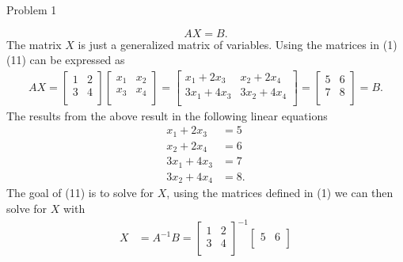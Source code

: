 \begin{problem}{Problem 1}
\begin{highlight}[Solution]
        \begin{equation}
            AX = B.
        \end{equation}
        The matrix $X$ is just a generalized matrix of variables. Using the matrices in (1) (11) can be expressed as 
        \begin{align*}
            AX = 
            \begin{bmatrix}
                1 & 2 \\
                3 & 4 \\
            \end{bmatrix}
            \begin{bmatrix}
                x_{1} & x_{2} \\
                x_{3} & x_{4} \\
            \end{bmatrix}
            = 
            \begin{bmatrix}
                x_{1} + 2x_{3} & x_{2} + 2x_{4} \\
                3x_{1} + 4x_{3} & 3x_{2} + 4x_{4} \\
            \end{bmatrix}
            = 
            \begin{bmatrix}
                5 & 6 \\
                7 & 8 \\
            \end{bmatrix} = B.
        \end{align*}
        The results from the above result in the following linear equations
        \begin{align*}
            x_{1} + 2x_{3} & = 5 \\
            x_{2} + 2x_{4} & = 6 \\
            3x_{1} + 4x_{3} & = 7 \\
            3x_{2} + 4x_{4} & = 8.
        \end{align*}
        The goal of (11) is to solve for $X$, using the matrices defined in (1) we can then solve for $X$ with 
        \begin{align*}
            X & = A^{-1}B = 
            \begin{bmatrix}
                1 & 2 \\
                3 & 4 \\
            \end{bmatrix}^{-1}
            \begin{bmatrix}
                5 & 6 \\

\end{bmatrix}
\end{align*}
\end{highlight}
\end{problem}
